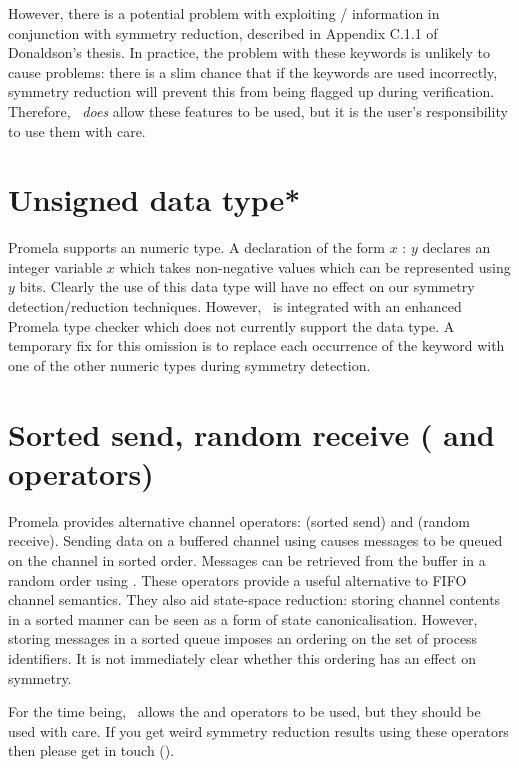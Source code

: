 However, there is a potential problem with exploiting
/ information in conjunction with symmetry
reduction, described in Appendix C.1.1 of Donaldson's thesis.  In practice, the
problem with these keywords is unlikely to cause problems: there
is a slim chance that if the keywords are used incorrectly, symmetry reduction
will prevent this from being flagged up during verification.  Therefore, \topspin\
\emph{does} allow these features to be used, but it is the user's responsibility to
use them with care.



\section{Unsigned data type*}

Promela supports an 
numeric type. A declaration of the form  $x$ : $y$
declares an integer variable $x$ which takes non-negative values
which can be represented using $y$ bits.  Clearly the use of this
data type will have no effect on our symmetry detection/reduction
techniques. However, \topspin\ is integrated with an enhanced
Promela type checker which does not currently support the 
data type.  A temporary fix for this omission is to replace each occurrence of the
\inline{unsigned} keyword with one of the other numeric types during
symmetry detection.

\section{Sorted send, random receive (\protect\inline{!!} and \protect{} operators)}

Promela provides alternative channel operators: \inline{!!} (sorted
send) and \inline{??} (random receive).
Sending data on a buffered channel using \inline{!!} causes messages to be queued on the
channel in sorted order. Messages can be retrieved from the buffer
in a random order using \inline{??}. These operators provide a
useful alternative to FIFO channel semantics. They also aid
state-space reduction: storing channel contents in a sorted manner
can be seen as a form of state canonicalisation. However, storing
\inline{pid} messages in a sorted queue imposes an ordering on the set
of process identifiers.  It is not immediately clear whether this
ordering has an effect on symmetry.

For the time being, \topspin\ allows the \inline{!!} and  operators to be
used, but they should be used with care.  If you get weird symmetry reduction
results using these operators then please get in touch ().

